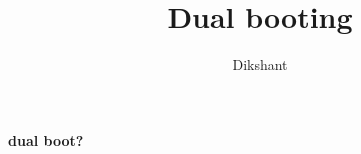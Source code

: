 \documentclass{article}
\title{Dual booting}
\author{
Dikshant
}
\begin{document}
\large \maketitle


\begin{center}
    \textbf{dual boot?}
\end{center}
\end{document}
